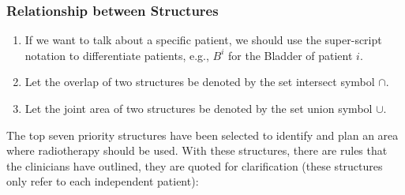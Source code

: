 \documentclass[12pt,twoside]{report}
\begin{document}


\subsubsection{Relationship between Structures}

  \begin{enumerate}
    \item If we want to talk about a specific patient, we should use the super-script notation to differentiate patients, e.g., $B^i$ for the Bladder of patient $i$.
    \item Let the overlap of two structures be denoted by the set intersect symbol $\cap$.
    \item Let the joint area of two structures be denoted by the set union symbol $\cup$.
  \end{enumerate}


The top seven priority structures have been selected to identify and plan an area where radiotherapy should be used. With these structures, there are rules that the clinicians have outlined, they are quoted for clarification (these structures only refer to each independent patient):
\end{document}
